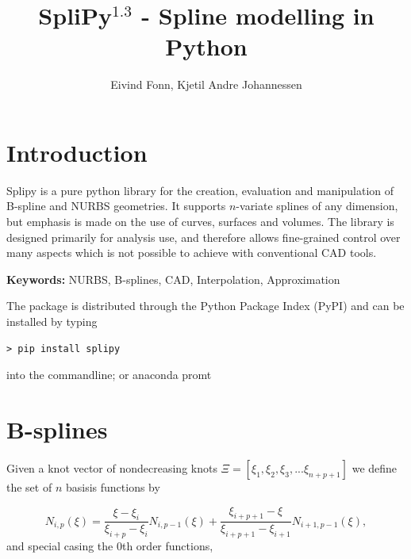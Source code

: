 \documentclass[landscape]{sintefposter}
\title{SpliPy$^{1.3}$ - Spline modelling in Python}
\author{Eivind Fonn, Kjetil Andre Johannessen }
\institute{SINTEF Digital, Dept. of Mathematics and Cybernetics, Trondheim, Norway}
\begin{document}
\maketitle

\begin{multicols}{3}
\section{Introduction}
\begin{tcolorbox}[colback=sintefblue!10!white,colframe=sintefblue,title=Abstract]
  Splipy is a pure python library for the creation, evaluation and manipulation of B-spline and NURBS geometries.
  It supports $n$-variate splines of any dimension, but emphasis is made on the use of curves, surfaces and volumes.
  The library is designed primarily for analysis use, and therefore allows fine-grained control over many aspects which is not possible to achieve with conventional CAD tools.
\end{tcolorbox}
\textbf{Keywords:} NURBS, B-splines, CAD, Interpolation, Approximation
\vspace{1cm}

\begin{tcolorbox}[colback=white,colframe=sintefblue,title=Installation]
  The package is distributed through the Python Package Index (PyPI) and can be installed by typing
  \begin{tcolorbox}[colback=sinteflightgrey]
  \begin{verbatim}
> pip install splipy \end{verbatim}
  \end{tcolorbox}
  into the commandline; or anaconda promt
\end{tcolorbox}

\vspace{-2cm}
\section{B-splines}
Given a knot vector of nondecreasing knots $\Xi=[\xi_1, \xi_2, \xi_3, ... \xi_{n+p+1}]$ we define the set of $n$ basisis functions by
\begin{tcolorbox}[colback=sintefblue!10!white,colframe=sintefblue,title=The basis]
  \begin{equation}
    \label{eq:bspline}
    N_{i,p}(\xi) = \frac{\xi - \xi_i}{\xi_{i+p}-\xi_i}N_{i,p-1}(\xi) + \frac{\xi_{i+p+1}-\xi}{\xi_{i+p+1}-\xi_{i+1}}N_{i+1,p-1}(\xi),
  \end{equation}
  and special casing the 0th order functions,
\end{tcolorbox}


\end{multicols}
\end{document}
